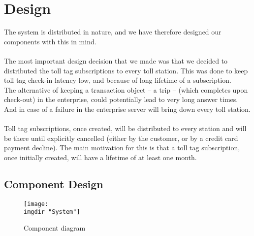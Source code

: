 \chapter{Design}
\noindent
The system is distributed in nature, and we have therefore designed our components with this in mind.\\\\
The most important design decision that we made was that we decided to distributed the toll tag subscriptions to every toll station. This was done to keep toll tag check-in latency low, and because of long lifetime of a subscription.\\
The alternative of keeping a transaction object -- a trip -- (which completes upon check-out) in the enterprise, could potentially lead to very long answer times. And in case of a failure in the enterprise server will bring down every toll station.\\\\
Toll tag subscriptions, once created, will be distributed to every station and will be there until explicitly cancelled (either by the customer, or by a credit card payment decline). The main motivation for this is that a toll tag subscription, once initially created, will have a lifetime of at least one month.
\section{Component Design}

\begin{figure}
  \centering
  \texttt{[image: \\imgdir "System"]}
  \caption{Component diagram}
  \label{fig:component_diagram}
\end{figure}

